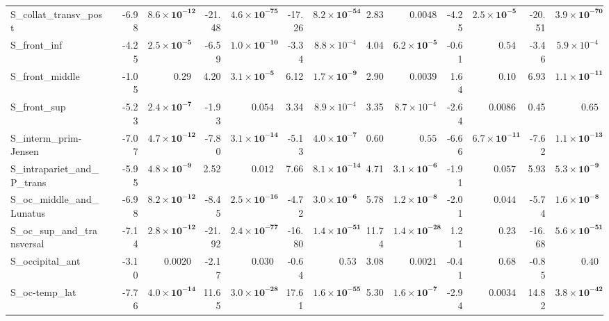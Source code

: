 {\begin{longtable}{llrrrrrrrrrrrr}
S\_collat\_transv\_post &  & -6.98 & $\mathbf{8.6{\times}10^{-12}}$ & -21.48 & $\mathbf{4.6{\times}10^{-75}}$ & -17.26 & $\mathbf{8.2{\times}10^{-54}}$ & 2.83 & $0.0048$ & -4.25 & $\mathbf{2.5{\times}10^{-5}}$ & -20.51 & $\mathbf{3.9{\times}10^{-70}}$ \\
S\_front\_inf &  & -4.25 & $\mathbf{2.5{\times}10^{-5}}$ & -6.59 & $\mathbf{1.0{\times}10^{-10}}$ & -3.34 & $8.8{\times}10^{-4}$ & 4.04 & $\mathbf{6.2{\times}10^{-5}}$ & -0.61 & $0.54$ & -3.46 & $5.9{\times}10^{-4}$ \\
S\_front\_middle &  & -1.05 & $0.29$ & 4.20 & $\mathbf{3.1{\times}10^{-5}}$ & 6.12 & $\mathbf{1.7{\times}10^{-9}}$ & 2.90 & $0.0039$ & 1.64 & $0.10$ & 6.93 & $\mathbf{1.1{\times}10^{-11}}$ \\
S\_front\_sup &  & -5.23 & $\mathbf{2.4{\times}10^{-7}}$ & -1.93 & $0.054$ & 3.34 & $8.9{\times}10^{-4}$ & 3.35 & $8.7{\times}10^{-4}$ & -2.64 & $0.0086$ & 0.45 & $0.65$ \\
S\_interm\_prim-Jensen &  & -7.07 & $\mathbf{4.7{\times}10^{-12}}$ & -7.80 & $\mathbf{3.1{\times}10^{-14}}$ & -5.13 & $\mathbf{4.0{\times}10^{-7}}$ & 0.60 & $0.55$ & -6.66 & $\mathbf{6.7{\times}10^{-11}}$ & -7.62 & $\mathbf{1.1{\times}10^{-13}}$ \\
S\_intrapariet\_and\_P\_trans &  & -5.95 & $\mathbf{4.8{\times}10^{-9}}$ & 2.52 & $0.012$ & 7.66 & $\mathbf{8.1{\times}10^{-14}}$ & 4.71 & $\mathbf{3.1{\times}10^{-6}}$ & -1.91 & $0.057$ & 5.93 & $\mathbf{5.3{\times}10^{-9}}$ \\
S\_oc\_middle\_and\_Lunatus &  & -6.98 & $\mathbf{8.2{\times}10^{-12}}$ & -8.45 & $\mathbf{2.5{\times}10^{-16}}$ & -4.72 & $\mathbf{3.0{\times}10^{-6}}$ & 5.78 & $\mathbf{1.2{\times}10^{-8}}$ & -2.01 & $0.044$ & -5.74 & $\mathbf{1.6{\times}10^{-8}}$ \\
S\_oc\_sup\_and\_transversal &  & -7.14 & $\mathbf{2.8{\times}10^{-12}}$ & -21.92 & $\mathbf{2.4{\times}10^{-77}}$ & -16.80 & $\mathbf{1.4{\times}10^{-51}}$ & 11.74 & $\mathbf{1.4{\times}10^{-28}}$ & 1.21 & $0.23$ & -16.68 & $\mathbf{5.6{\times}10^{-51}}$ \\
S\_occipital\_ant &  & -3.10 & $0.0020$ & -2.17 & $0.030$ & -0.64 & $0.53$ & 3.08 & $0.0021$ & -0.41 & $0.68$ & -0.85 & $0.40$ \\
S\_oc-temp\_lat &  & -7.76 & $\mathbf{4.0{\times}10^{-14}}$ & 11.65 & $\mathbf{3.0{\times}10^{-28}}$ & 17.61 & $\mathbf{1.6{\times}10^{-55}}$ & 5.30 & $\mathbf{1.6{\times}10^{-7}}$ & -2.94 & $0.0034$ & 14.82 & $\mathbf{3.8{\times}10^{-42}}$ \\

\end{longtable}}

